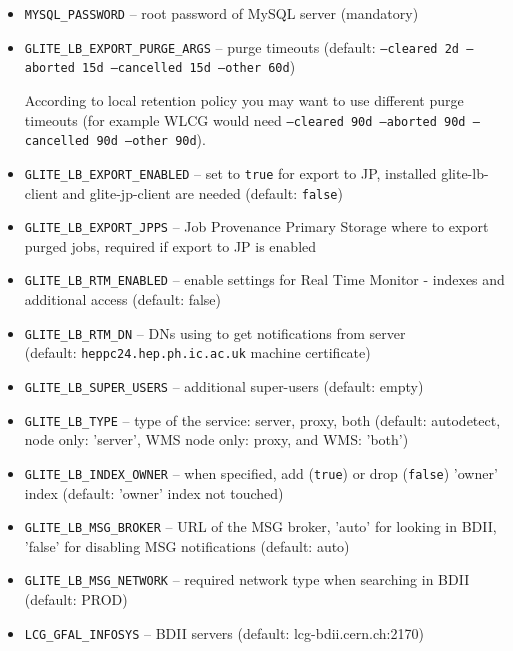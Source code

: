 \begin{itemize}
\item \texttt{MYSQL\_PASSWORD} -- root password of MySQL server (mandatory)
\item \texttt{GLITE\_LB\_EXPORT\_PURGE\_ARGS} -- purge timeouts (default: \texttt{--cleared 2d --aborted 15d --cancelled 15d --other 60d})

According to local retention policy you may want to use different purge timeouts (for example WLCG would need \texttt{--cleared 90d --aborted 90d --cancelled 90d --other 90d}).
\item \texttt{GLITE\_LB\_EXPORT\_ENABLED} -- set to \texttt{true} for export to JP, installed glite-lb-client and glite-jp-client are needed (default: \texttt{false})
\item \texttt{GLITE\_LB\_EXPORT\_JPPS} -- Job Provenance Primary Storage where to export purged jobs, required if export to JP is enabled
\item \texttt{GLITE\_LB\_RTM\_ENABLED} -- enable settings for Real Time Monitor - indexes and additional access (default: false)
\item \texttt{GLITE\_LB\_RTM\_DN} -- DNs using to get notifications from \LB server\\
(default: \texttt{heppc24.hep.ph.ic.ac.uk} machine certificate)
\item \texttt{GLITE\_LB\_SUPER\_USERS} -- additional super-users (default: empty)
\item \texttt{GLITE\_LB\_TYPE} -- type of the \LB service: server, proxy, both (default: autodetect, \LB node only: 'server', WMS node only: proxy, \LB and WMS: 'both')
\item \texttt{GLITE\_LB\_INDEX\_OWNER} -- when specified, add (\texttt{true}) or drop (\texttt{false}) 'owner' index (default: 'owner' index not touched)
\item \texttt{GLITE\_LB\_MSG\_BROKER} -- URL of the MSG broker, 'auto' for looking in BDII, 'false' for disabling MSG notifications (default: auto)
\item \texttt{GLITE\_LB\_MSG\_NETWORK} -- required network type when searching in BDII (default: PROD)
\item \texttt{LCG\_GFAL\_INFOSYS} -- BDII servers (default: lcg-bdii.cern.ch:2170)
\end{itemize}

